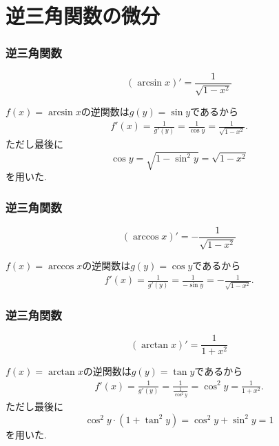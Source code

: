 \section{逆三角関数の微分}

\begin{frame}
\frametitle{逆三角関数}

\begin{Thm}
$$
(\arcsin x)'=\frac{1}{\sqrt{1-x^2}}
$$
\end{Thm}

$f(x)=\arcsin x$の逆関数は$g(y)=\sin y$であるから
\begin{align*}
f'(x)=\frac{1}{g'(y)}=\frac{1}{\cos y}=\frac{1}{\sqrt{1-x^2}}. 
\end{align*}
ただし最後に
$$
\cos y = \sqrt{1-\sin^2 y}=\sqrt{1-x^2}
$$
を用いた. 


\end{frame}





\begin{frame}
\frametitle{逆三角関数}

\begin{Thm}
$$
(\arccos x)'= - \frac{1}{\sqrt{1-x^2}}
$$
\end{Thm}

$f(x)=\arccos x$の逆関数は$g(y)=\cos y$であるから
\begin{align*}
f'(x)=\frac{1}{g'(y)}=\frac{1}{- \sin y}=-\frac{1}{\sqrt{1-x^2}}. 
\end{align*}
\end{frame}




\begin{frame}
\frametitle{逆三角関数}

\begin{Thm}
$$
(\arctan x)'= \frac{1}{1+x^2}
$$
\end{Thm}

$f(x)=\arctan x$の逆関数は$g(y)=\tan y$であるから
\begin{align*}
f'(x)=\frac{1}{g'(y)}=\frac{1}{\frac{1}{\cos^2 y}}=\cos^2 y = \frac{1}{1+x^2}.  
\end{align*}
ただし最後に
$$
\cos^2 y \cdot (1+\tan^2 y)=\cos^2 y + \sin^2 y = 1
$$
を用いた. 

\end{frame}


